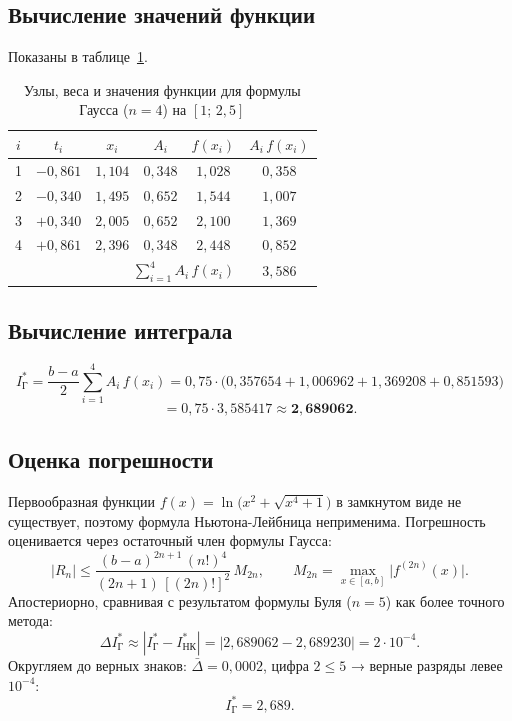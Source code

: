 \documentclass[a4paper, final]{article}
\begin{document}
\subsection{Вычисление значений функции}
Показаны в таблице~\ref{tab:gauss_calc}.

\begin{table}[h!]
\centering
\caption{Узлы, веса и значения функции для формулы Гаусса ($n=4$) на $[1;\,2{,}5]$}
\label{tab:gauss_calc}
\renewcommand{\arraystretch}{1.3}
\begin{tabular}{|c|c|c|c|c|c|}
\hline
$i$ & $t_i$ & $x_i$ & $A_i$ & $f(x_i)$ & $A_i\,f(x_i)$ \\
\hline
1 & $-0{,}861$ & $1{,}104$ & $0{,}348$ & $1{,}028$ & $0{,}358$ \\
2 & $-0{,}340$ & $1{,}495$ & $0{,}652$ & $1{,}544$ & $1{,}007$ \\
3 & $+0{,}340$ & $2{,}005$ & $0{,}652$ & $2{,}100$ & $1{,}369$ \\
4 & $+0{,}861$ & $2{,}396$ & $0{,}348$ & $2{,}448$ & $0{,}852$ \\
\hline
\multicolumn{5}{|r|}{$\displaystyle\sum_{i=1}^{4} A_i\,f(x_i)$} & $3{,}586$ \\
\hline
\end{tabular}
\end{table}

\subsection{Вычисление интеграла}

\[
I^*_\text{Г} = \frac{b-a}{2}\sum_{i=1}^{4}A_i\,f(x_i)
= 0{,}75\cdot\bigl(0{,}357654+1{,}006962+1{,}369208+0{,}851593\bigr)\]
\[= 0{,}75\cdot 3{,}585417
\approx \mathbf{2{,}689062}.
\]


\subsection{Оценка погрешности}

Первообразная функции $f(x) = \ln\!\bigl(x^2+\sqrt{x^4+1}\bigr)$
в замкнутом виде не существует, поэтому формула Ньютона-Лейбница
неприменима. Погрешность оценивается через остаточный член
формулы Гаусса:
\[
|R_n| \leq \frac{(b-a)^{2n+1}\,(n!)^4}{(2n+1)\,[(2n)!]^2}\,M_{2n},
\qquad M_{2n} = \max_{x\in[a,b]}\bigl|f^{(2n)}(x)\bigr|.
\]
Апостериорно, сравнивая с результатом формулы Буля ($n=5$)
как более точного метода:
\[
\Delta I^*_\text{Г} \approx |I^*_\text{Г} - I^*_\text{НК}|
= |2{,}689062 - 2{,}689230| = 2\cdot10^{-4}.
\]
Округляем до верных знаков: $\bar\Delta = 0{,}0002$,
цифра $2 \leq 5$ → верные разряды левее $10^{-4}$:
\[
\boxed{I^*_\text{Г} = 2{,}689.}
\]
\end{document}
